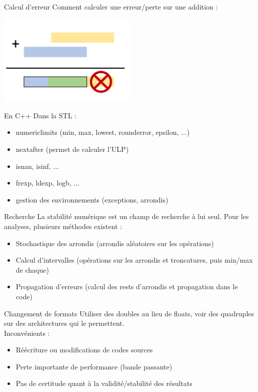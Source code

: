 \documentclass{beamer}
\begin{document}
    \begin{frame}{Calcul d'erreur}
    Comment calculer une erreur/perte sur une addition :
    \begin{center}
      \includegraphics[width=0.5\textwidth]{addition}
      \errorcomputing
      \end{center}
        \end{frame}
        
  \begin{frame}{En C++}
    Dans la STL :
    \begin{itemize}
    \item numeric\textunderscore limits (min, max, lowest, round\textunderscore error, epsilon, ...)
    \item nextafter (permet de calculer l'ULP)
    \item isnan, isinf, ...
    \item frexp, ldexp, logb, ...
    \item gestion des environnements (exceptions, arrondis)
    \end{itemize}
  \end{frame}
  
  \begin{frame}{Recherche}
La stabilité numérique est un champ de recherche à lui seul. Pour les analyses, plusieurs méthodes existent : 
\begin{itemize}
\item Stochastique des arrondis (arrondis aléatoires sur les opérations)
\item Calcul d'intervalles (opérations sur les arrondis et troncatures, puis min/max de chaque)
\item Propagation d'erreurs (calcul des rests d'arrondis et propagation dans le code)
\end{itemize}
  \end{frame}
    
  
    \begin{frame}{Changement de formats}
  Utiliser des doubles au lieu de floats, voir des quadruples sur des architectures qui le permettent. \\
  Inconvénients :
  \begin{itemize}
  \item Réécriture ou modifications de codes sources
  \item Perte importante de performance (bande passante)
  \item Pas de certitude quant à la validité/stabilité des résultats
  \end{itemize} 
  \end{frame}
  
\end{document}
